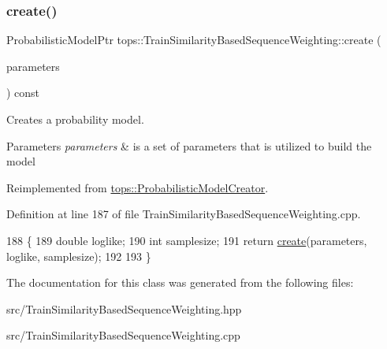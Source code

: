 \subsubsection{\texorpdfstring{create()}{create()}}
{\footnotesize\ttfamily Probabilistic\+Model\+Ptr tops\+::\+Train\+Similarity\+Based\+Sequence\+Weighting\+::create (\begin{DoxyParamCaption}\item[{\hyperlink{classtops_1_1ProbabilisticModelParameters}{Probabilistic\+Model\+Parameters} \&}]{parameters }\end{DoxyParamCaption}) const\hspace{0.3cm}{\ttfamily [virtual]}}



Creates a probability model. 


\begin{DoxyParams}{Parameters}
{\em parameters} & is a set of parameters that is utilized to build the model \\
\hline
\end{DoxyParams}


Reimplemented from \hyperlink{classtops_1_1ProbabilisticModelCreator_afed6c8ffa45fff446bdaa8b533da8f7c}{tops\+::\+Probabilistic\+Model\+Creator}.



Definition at line 187 of file Train\+Similarity\+Based\+Sequence\+Weighting.\+cpp.


\begin{DoxyCode}
188                                                                                                            
                  \{
189     \textcolor{keywordtype}{double} loglike;
190     \textcolor{keywordtype}{int} samplesize;
191     \textcolor{keywordflow}{return} \hyperlink{classtops_1_1TrainSimilarityBasedSequenceWeighting_afccb17be7a84c13a4e7166a583b3597e}{create}(parameters, loglike, samplesize);
192 
193   \}
\end{DoxyCode}


The documentation for this class was generated from the following files\+:\begin{DoxyCompactItemize}
\item 
src/Train\+Similarity\+Based\+Sequence\+Weighting.\+hpp\item 
src/Train\+Similarity\+Based\+Sequence\+Weighting.\+cpp\end{DoxyCompactItemize}
